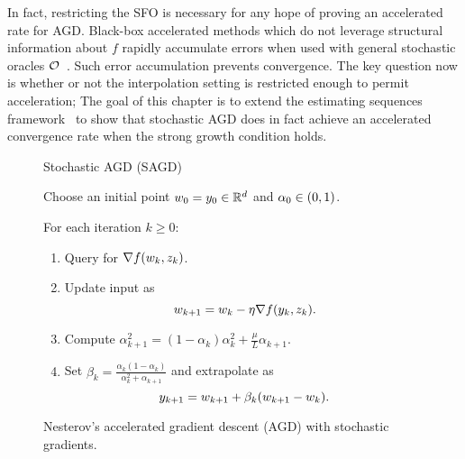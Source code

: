 In fact, restricting the SFO is necessary for any hope of proving an accelerated rate for AGD.
Black-box accelerated methods which do not leverage structural information about \( f \) rapidly accumulate errors when used with general stochastic oracles \( \oracle{} \)~\citep{devolder2014first, schmidt2011convergence}. 
Such error accumulation prevents convergence. 
The key question now is whether or not the interpolation setting is restricted enough to permit acceleration;
The goal of this chapter is to extend the estimating sequences framework~\citep{nesterov2004lectures} to show that stochastic AGD does in fact achieve an accelerated convergence rate when the strong growth condition holds.

\begin{figure}[t]
    \centering
    \begin{procedure}{Stochastic AGD (SAGD)}
    \item Choose an initial point \( \w_0 = y_0 \in \R^d \) and \( \alpha_0 \in \rbr{0,1} \).
        \item For each iteration \( k \geq 0 \):
            \begin{enumerate}
                \item Query \oracle{} for \( \grad(\wk, \zk) \). 
                \item Update input as\vspace{-1ex}%
                \[ \wkk = \wk - \eta \grad(\yk, \zk). \]
                \item Compute 
                    \( \alpha_{k+1}^2 = (1 - \alpha_k)\alpha_k^2 + \frac{\mu}{L} \alpha_{k+1} \).
                \item Set \( \beta_{k} = \frac{\alpha_k (1-\alpha_k)}{\alpha_k^2 + \alpha_{k+1}} \) and extrapolate as
                    \[ \ykk = \wkk + \beta_k (\wkk - \wk).  \] 
            \end{enumerate}
    \end{procedure}
    \caption{Nesterov's accelerated gradient descent (AGD) with stochastic gradients.}%
    \label{procedure:accelerated-sgd}
\end{figure} 

